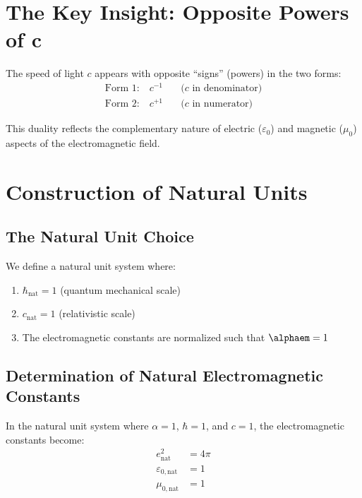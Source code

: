 	\section{The Key Insight: Opposite Powers of c}
	
	\begin{lemma}
		The speed of light $c$ appears with opposite ``signs'' (powers) in the two forms:
		\begin{align}
			\text{Form 1:} \quad c^{-1} \quad &\text{($c$ in denominator)}\\
			\text{Form 2:} \quad c^{+1} \quad &\text{($c$ in numerator)}
		\end{align}
	\end{lemma}
	
	This duality reflects the complementary nature of electric ($\varepsilon_0$) and magnetic ($\mu_0$) aspects of the electromagnetic field.
	
	\section{Construction of Natural Units}
	
	\subsection{The Natural Unit Choice}
	
	\begin{definition}[Natural Unit System for $\alpha = 1$]
		We define a natural unit system where:
		\begin{enumerate}
			\item $\hbar_{\text{nat}} = 1$ (quantum mechanical scale)
			\item $c_{\text{nat}} = 1$ (relativistic scale)  
			\item The electromagnetic constants are normalized such that $\alphaem = 1$
		\end{enumerate}
	\end{definition}
	
	\subsection{Determination of Natural Electromagnetic Constants}
	
	\begin{theorem}
		In the natural unit system where $\alpha = 1$, $\hbar = 1$, and $c = 1$, the electromagnetic constants become:
		\begin{align}
			e_{\text{nat}}^2 &= 4\pi \label{eq:e_nat}\\
			\varepsilon_{0,\text{nat}} &= 1 \label{eq:eps_nat}\\
			\mu_{0,\text{nat}} &= 1 \label{eq:mu_nat}
		\end{align}
	\end{theorem}
	
